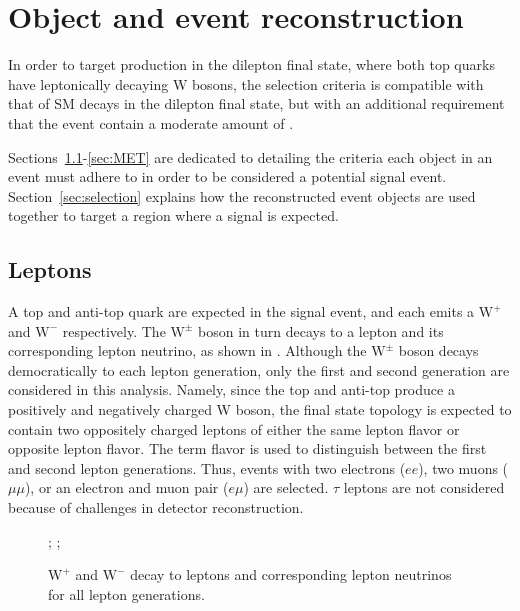 \chapter{Object and event reconstruction}
\label{chap:eventreco}

In order to target \ttDM production in the dilepton final state, where both top quarks have leptonically decaying W bosons, the selection criteria is compatible with that of SM \ttbar decays in the dilepton final state, but with an additional requirement that the event contain a moderate amount of \MET.

Sections~\ref{sec:leps}-\ref{sec:MET} are dedicated to detailing the criteria each object in an event must adhere to in order to be considered a potential signal event. Section~\ref{sec:selection} explains how the reconstructed event objects are used together to target a region where a \ttllDM signal is expected.

\section{Leptons}
\label{sec:leps}
A top and anti-top quark are expected in the signal event, and each emits a $\mathrm{W^+}$ and $\mathrm{W^-}$ respectively. The $\mathrm{W^\pm}$ boson in turn decays to a lepton and its corresponding lepton neutrino, as shown in . Although the $\mathrm{W^\pm}$ boson decays democratically to each lepton generation, only the first and second generation are considered in this analysis. Namely, since the top and anti-top produce a positively and negatively charged W boson, the final state topology is expected to contain two oppositely charged leptons of either the same lepton flavor or opposite lepton flavor. The term flavor is used to distinguish between the first and second lepton generations. Thus, events with two electrons ($ee$), two muons ($\mu\mu$), or an electron and muon pair ($e\mu$) are selected. $\tau$ leptons are not considered because of challenges in detector reconstruction. 

\begin{figure}
  ;
  ;
  \caption{$\mathrm{W^+}$ and $\mathrm{W^-}$ decay to leptons and corresponding lepton neutrinos for all lepton generations.}
  \label{fig:Wdecay}
\end{figure}

